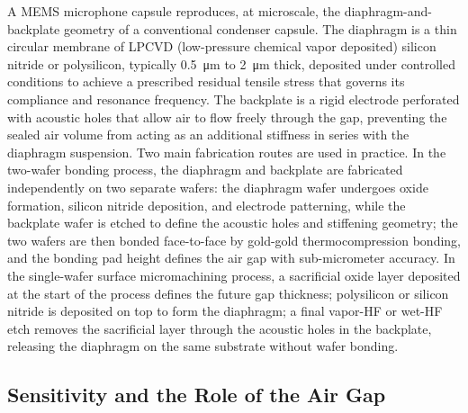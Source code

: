 A MEMS microphone capsule reproduces, at microscale, the diaphragm-and-backplate geometry of a conventional condenser capsule.
The diaphragm is a thin circular membrane of LPCVD (low-pressure chemical vapor deposited) silicon nitride or polysilicon, typically \SI{0.5}{\micro\meter} to \SI{2}{\micro\meter} thick, deposited under controlled conditions to achieve a prescribed residual tensile stress that governs its compliance and resonance frequency.
The backplate is a rigid electrode perforated with acoustic holes that allow air to flow freely through the gap, preventing the sealed air volume from acting as an additional stiffness in series with the diaphragm suspension.
Two main fabrication routes are used in practice.
In the two-wafer bonding process, the diaphragm and backplate are fabricated independently on two separate wafers: the diaphragm wafer undergoes oxide formation, silicon nitride deposition, and electrode patterning, while the backplate wafer is etched to define the acoustic holes and stiffening geometry; the two wafers are then bonded face-to-face by gold-gold thermocompression bonding, and the bonding pad height defines the air gap with sub-micrometer accuracy.
In the single-wafer surface micromachining process, a sacrificial oxide layer deposited at the start of the process defines the future gap thickness; polysilicon or silicon nitride is deposited on top to form the diaphragm; a final vapor-HF or wet-HF etch removes the sacrificial layer through the acoustic holes in the backplate, releasing the diaphragm on the same substrate without wafer bonding.

\subsection{Sensitivity and the Role of the Air Gap}


